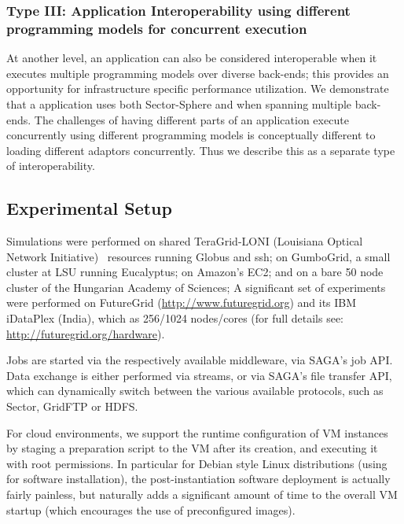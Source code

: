 \documentclass[3p,twocolumn]{elsarticle}
\begin{document}
\subsubsection{Type III: Application Interoperability using different
  programming models for concurrent execution}
%
%

At another level, an application can also be considered interoperable
when it executes multiple programming models  over
diverse back-ends; this provides an opportunity for infrastructure
specific performance utilization.  We demonstrate that a \wc
application uses both Sector-Sphere and \smr when spanning multiple
back-ends.  The challenges of having different parts of
an application execute concurrently using different programming models
is conceptually different to loading different adaptors concurrently.
Thus we describe this as a separate type of interoperability.

\subsection{Experimental Setup}

Simulations were performed on shared TeraGrid-LONI (Louisiana Optical
Network Initiative)~\cite{loni} resources running Globus and ssh;
on GumboGrid, a small cluster at LSU running Eucalyptus; on Amazon's
EC2; and on a bare 50 node cluster of the Hungarian Academy of Sciences;
A significant set of experiments were performed on FutureGrid
(\url{http://www.futuregrid.org}) and its IBM iDataPlex (India), which
as 256/1024 nodes/cores (for full details see:
\url{http://futuregrid.org/hardware}).

Jobs are started via the respectively available middleware, via
SAGA's job API.  Data exchange is either performed via streams, or via
SAGA's file transfer API, which can dynamically switch between the
various available protocols, such as Sector, GridFTP or HDFS.

For cloud environments, we support the runtime configuration of VM
instances by staging a preparation script to the VM after its
creation, and executing it with root permissions.  In particular for
Debian style Linux distributions (using  for software
installation), the
post-instantiation software deployment is actually fairly painless,
but naturally adds a significant amount of time to the overall VM
startup (which encourages the use of preconfigured images).
\end{document}
